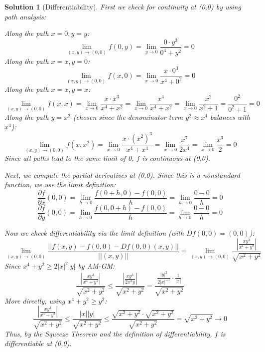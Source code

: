 \documentclass{article}
\newtheorem{solution}{Solution}
\begin{document}
\begin{solution}[Differentiability]
    First we check for continuity at (0,0) by using path analysis:

    \noindent Along the path \(x = 0, y = y\):
    \[\lim_{(x,y) \to (0,0)} f(0,y) = \lim_{y \to 0} \frac{0 \cdot y^3}{0^4 + y^2} = 0\]
    \noindent Along the path \(x = x, y = 0\):
    \[\lim_{(x,y) \to (0,0)} f(x,0) = \lim_{x \to 0} \frac{x \cdot 0^3}{x^4 + 0^2} = 0\]
    \noindent Along the path \(x = x, y = x\):
    \[\lim_{(x,y) \to (0,0)} f(x,x) = \lim_{x \to 0} \frac{x \cdot x^3}{x^4 + x^2} = \lim_{x \to 0} \frac{x^4}{x^4 + x^2} = \lim_{x \to 0} \frac{x^2}{x^2 + 1} = \frac{0^2}{0^2 + 1} = 0\]
    \noindent Along the path \(y = x^2\) (chosen since the denominator term \(y^2 \approx x^4\) balances with \(x^4\)):
    \[\lim_{(x,y) \to (0,0)} f(x,x^2) = \lim_{x \to 0} \frac{x \cdot (x^2)^3}{x^4 + x^4} = \lim_{x \to 0} \frac{x^7}{2x^4} = \lim_{x \to 0} \frac{x^3}{2} = 0\]
    Since all paths lead to the same limit of 0, \(f\) is continuous at (0,0).

    Next, we compute the partial derivatives at (0,0). Since this is a nonstandard function, we use the limit definition:
    \[\frac{\partial f}{\partial x}(0,0) = \lim_{h \to 0} \frac{f(0 + h, 0) - f(0,0)}{h} = \lim_{h \to 0} \frac{0 - 0}{h} = 0\]
    \[\frac{\partial f}{\partial y}(0,0) = \lim_{h \to 0} \frac{f(0, 0 + h) - f(0,0)}{h} = \lim_{h \to 0} \frac{0 - 0}{h} = 0\]

    Now we check differentiability via the limit definition (with \(Df(0,0) = (0,0)\)):
    \[\lim_{(x,y) \to (0,0)} \frac{||f(x,y) - f(0,0) - Df(0,0)(x,y)||}{||(x,y)||}
    = \lim_{(x,y) \to (0,0)} \frac{\left|\frac{x y^3}{x^4 + y^2}\right|}{\sqrt{x^2 + y^2}}\]
    Since \(x^4 + y^2 \geq 2|x|^2|y|\) by AM-GM:
    \[\frac{\left|\frac{x y^3}{x^4 + y^2}\right|}{\sqrt{x^2 + y^2}} \leq \frac{\left|\frac{x y^3}{2x^2 y}\right|}{\sqrt{x^2 + y^2}}
    = \frac{\frac{|y|^2}{2|x|^{-1}}\cdot \frac{1}{|x|}}{\sqrt{x^2+y^2}}\]
    More directly, using \(x^4 + y^2 \geq y^2\):
    \[\frac{\left|\frac{x y^3}{x^4 + y^2}\right|}{\sqrt{x^2 + y^2}} \leq \frac{|x||y|}{\sqrt{x^2 + y^2}} \leq \frac{\sqrt{x^2+y^2}\cdot\sqrt{x^2+y^2}}{\sqrt{x^2+y^2}} = \sqrt{x^2+y^2} \to 0\]
    Thus, by the Squeeze Theorem and the definition of differentiability, \(f\) is differentiable at (0,0).
\end{solution}
\end{document}

